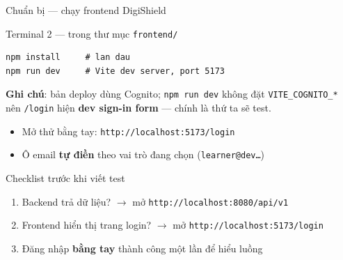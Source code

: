\documentclass[aspectratio=169,12pt]{beamer}
\begin{document}
\begin{frame}[fragile]{Chuẩn bị --- chạy frontend DigiShield}
  \begin{exampleblock}{Terminal 2 --- trong thư mục \texttt{frontend/}}
\begin{lstlisting}[language={}]
npm install     # lan dau
npm run dev     # Vite dev server, port 5173
\end{lstlisting}
  \end{exampleblock}

  {\scriptsize \textbf{Ghi chú}: bản deploy dùng Cognito; \texttt{npm run dev}
  không đặt \texttt{VITE\_COGNITO\_*} nên \texttt{/login} hiện
  \textbf{dev sign-in form} --- chính là thứ ta sẽ test.}
  \vspace{-0.4em}

  \begin{itemize}
    \item Mở thử bằng tay: \texttt{http://localhost:5173/login}
    \item Ô email \textbf{tự điền} theo vai trò đang chọn
          (\texttt{learner@dev\ldots})
  \end{itemize}

  \begin{alertblock}{Checklist trước khi viết test}
    \begin{enumerate}
      \item Backend trả dữ liệu? $\to$ mở \texttt{http://localhost:8080/api/v1}
      \item Frontend hiển thị trang login? $\to$ mở \texttt{http://localhost:5173/login}
      \item Đăng nhập \textbf{bằng tay} thành công một lần để hiểu luồng
    \end{enumerate}
  \end{alertblock}
\end{frame}
\end{document}
